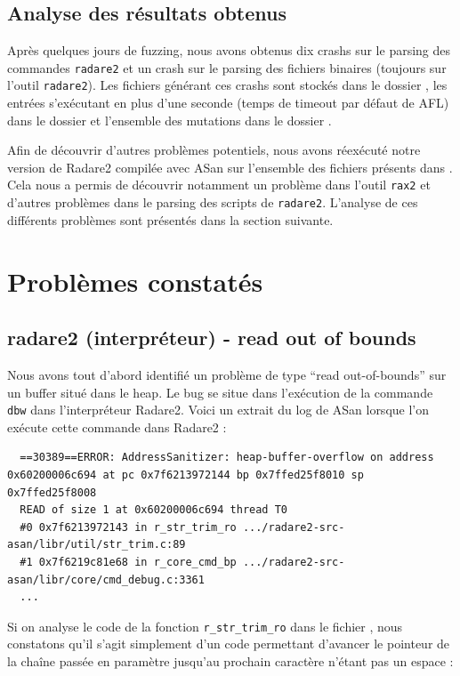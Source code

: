 \subsection{Analyse des résultats obtenus}

Après quelques jours de fuzzing, nous avons obtenus dix crashs sur le parsing des commandes \lstinline{radare2} et un crash sur le parsing des fichiers binaires (toujours sur l'outil \lstinline{radare2}).
Les fichiers générant ces crashs sont stockés dans le dossier , les entrées s'exécutant en plus d'une seconde (temps de timeout par défaut de AFL) dans le dossier  et l'ensemble des mutations dans le dossier .

Afin de découvrir d'autres problèmes potentiels, nous avons réexécuté notre version de Radare2 compilée avec ASan sur l'ensemble des fichiers présents dans .
Cela nous a permis de découvrir notamment un problème dans l'outil \lstinline{rax2} et d'autres problèmes dans le parsing des scripts de \lstinline{radare2}.
L'analyse de ces différents problèmes sont présentés dans la section suivante.

\section{Problèmes constatés}

\subsection{radare2 (interpréteur) - read out of bounds}

Nous avons tout d'abord identifié un problème de type ``read out-of-bounds'' sur un buffer situé dans le heap.
Le bug se situe dans l'exécution de la commande \lstinline{dbw} dans l'interpréteur Radare2.
Voici un extrait du log de ASan lorsque l'on exécute cette commande dans Radare2 :

\begin{lstlisting}
  ==30389==ERROR: AddressSanitizer: heap-buffer-overflow on address 0x60200006c694 at pc 0x7f6213972144 bp 0x7ffed25f8010 sp 0x7ffed25f8008
  READ of size 1 at 0x60200006c694 thread T0
  #0 0x7f6213972143 in r_str_trim_ro .../radare2-src-asan/libr/util/str_trim.c:89
  #1 0x7f6219c81e68 in r_core_cmd_bp .../radare2-src-asan/libr/core/cmd_debug.c:3361
  ...
\end{lstlisting}

Si on analyse le code de la fonction \lstinline{r_str_trim_ro} dans le fichier , nous constatons qu'il s'agit simplement d'un code permettant d'avancer le pointeur de la chaîne passée en paramètre jusqu'au prochain caractère n'étant pas un espace :

